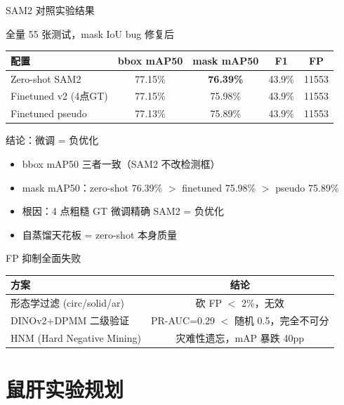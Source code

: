 \documentclass[aspectratio=169, 10pt]{beamer}
\begin{document}
\begin{frame}{SAM2 对照实验结果}
  \begin{block}{全量 55 张测试，mask IoU bug 修复后}
    \begin{tabular}{lcccc}
      \toprule
      \textbf{配置} & \textbf{bbox mAP50} & \textbf{mask mAP50} & \textbf{F1} & \textbf{FP} \\
      \midrule
      Zero-shot SAM2 & 77.15\% & \textbf{76.39\%} & 43.9\% & 11553 \\
      Finetuned v2 (4点GT) & 77.15\% & 75.98\% & 43.9\% & 11553 \\
      Finetuned pseudo & 77.13\% & 75.89\% & 43.9\% & 11553 \\
      \bottomrule
    \end{tabular}
  \end{block}
  \vspace{0em}
  \begin{alertblock}{结论：微调 = 负优化}
    \begin{itemize}
      \item bbox mAP50 三者一致（SAM2 不改检测框）
      \item mask mAP50：zero-shot 76.39\% $>$ finetuned 75.98\% $>$ pseudo 75.89\%
      \item 根因：4 点粗糙 GT 微调精确 SAM2 = 负优化
      \item 自蒸馏天花板 = zero-shot 本身质量
    \end{itemize}
  \end{alertblock}
  \vspace{0em}
  \begin{block}{FP 抑制全面失败}
    \begin{tabular}{lc}
      \toprule
      方案 & 结论 \\
      \midrule
      形态学过滤 (circ/solid/ar) & 砍 FP $<$ 2\%，无效 \\
      DINOv2+DPMM 二级验证 & PR-AUC=0.29 $<$ 随机 0.5，完全不可分 \\
      HNM (Hard Negative Mining) & 灾难性遗忘，mAP 暴跌 40pp \\
      \bottomrule
    \end{tabular}
  \end{block}
\end{frame}

\section{鼠肝实验规划}
\end{document}
